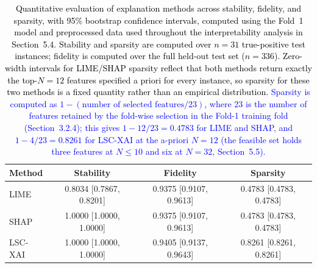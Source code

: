 \documentclass[a4paper,fleqn]{cas-sc}
\begin{document}
\begin{table}[pos=H]
\caption{\textcolor{black}{Quantitative evaluation of explanation methods across stability, fidelity, and sparsity, with 95\% bootstrap confidence intervals, computed using the Fold~1 model and preprocessed data
used throughout the interpretability analysis in Section~5.4. Stability and sparsity are computed over $n=31$ true-positive test instances; fidelity is computed over the full held-out test set ($n=336$). Zero-width intervals for LIME/SHAP sparsity reflect that both methods return exactly
the top-$N=12$ features specified a priori for every instance, so sparsity for these two methods is a fixed quantity rather than an empirical distribution. \textcolor{blue}{Sparsity is computed as $1 - (\text{number of selected features} / 23)$, where 23 is the number of features retained by the fold-wise selection in the Fold-1 training fold (Section~3.2.4); this gives $1 - 12/23 = 0.4783$ for LIME and SHAP, and $1 - 4/23 = 0.8261$ for LSC-XAI at the a-priori $N = 12$ (the feasible set holds three features at $N \le 10$ and six at $N = 32$, Section~5.5).}}}
\label{tab:xai_metrics}
\renewcommand{\arraystretch}{1.5}
\begin{tabular}{lccc}
\hline
\textbf{Method} & \textbf{Stability} & \textbf{Fidelity} & \textbf{Sparsity} \\
\hline
LIME     & 0.8034 [0.7867, 0.8201] & 0.9375 [0.9107, 0.9613] & 0.4783 [0.4783, 0.4783] \\
SHAP     & 1.0000 [1.0000, 1.0000] & 0.9375 [0.9107, 0.9613] & 0.4783 [0.4783, 0.4783] \\
LSC-XAI  & 1.0000 [1.0000, 1.0000] & 0.9405 [0.9137, 0.9643] & 0.8261 [0.8261, 0.8261] \\
\hline
\end{tabular}
\end{table}
\end{document}
